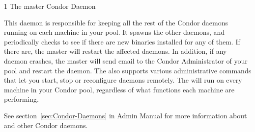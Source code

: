 \begin{ManPage}{\label{man-condor-master}}{1}
{The master Condor Daemon}
\Synopsis {}


\Description 

This daemon is responsible for keeping all the
rest of the Condor daemons running on each machine in your pool.  It  
spawns the other daemons, and periodically checks to see if there are
new binaries installed for any of them.  If there are, the master will
restart the affected daemons.  In addition, if any daemon crashes, the
master will send email to the Condor Administrator of your pool and 
restart the daemon.  The  also supports various
administrative commands that let you start, stop or reconfigure
daemons remotely.  The  will run on every machine in 
your Condor pool, regardless of what functions each machine are
performing.

See section~\ref{sec:Condor-Daemons} in Admin Manual for more information
about  and other Condor daemons.

\end{ManPage}

